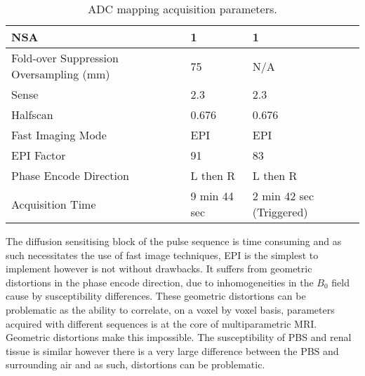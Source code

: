 \begin{table}[H]
\begin{tabularx}{1.0\textwidth}{X|X|X}
	NSA                                     & 1                                                                                & 1                                                                                \\ \hline
	Fold-over Suppression Oversampling (mm) & 75                                                                               & N/A                                                                              \\ \hline
	Sense                                   & 2.3                                                                              & 2.3                                                                              \\ \hline
	Halfscan                                & 0.676                                                                            & 0.676                                                                            \\ \hline
	Fast Imaging Mode                       & EPI                                                                              & EPI                                                                              \\ \hline
	EPI Factor                              & 91                                                                               & 83                                                                               \\ \hline
	Phase Encode Direction                  & L then R                                                                         & L then R                                                                         \\ \hline
	Acquisition Time                        & 9 min 44 sec                                                                     & 2 min 42 sec (Triggered)                                                        
	\end{tabularx}
	\caption{\ac{ADC} mapping acquisition parameters.}
	\label{tab:ex_adc_mapping}
\end{table}

The diffusion sensitising block of the pulse sequence is time consuming and as such necessitates the use of fast image techniques, \ac{EPI} is the simplest to implement however is not without drawbacks. It suffers from geometric distortions in the phase encode direction, due to inhomogeneities in the $B_0$ field cause by susceptibility differences. These geometric distortions can be problematic as the ability to correlate, on a voxel by voxel basis, parameters acquired with different sequences is at the core of multiparametric \ac{MRI}. Geometric distortions make this impossible. The susceptibility of \ac{PBS} and renal tissue is similar however there is a very large difference between the \ac{PBS} and surrounding air and as such, distortions can be problematic. 

